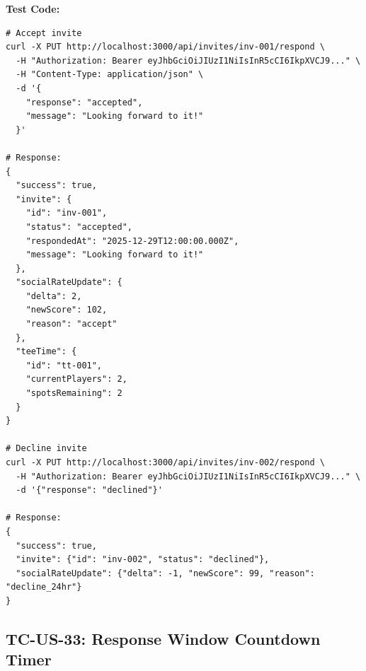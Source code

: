 \documentclass[11pt,a4paper]{article}
\begin{document}
\vspace{0.3cm}
\textbf{Test Code:}
\begin{lstlisting}
# Accept invite
curl -X PUT http://localhost:3000/api/invites/inv-001/respond \
  -H "Authorization: Bearer eyJhbGciOiJIUzI1NiIsInR5cCI6IkpXVCJ9..." \
  -H "Content-Type: application/json" \
  -d '{
    "response": "accepted",
    "message": "Looking forward to it!"
  }'

# Response:
{
  "success": true,
  "invite": {
    "id": "inv-001",
    "status": "accepted",
    "respondedAt": "2025-12-29T12:00:00.000Z",
    "message": "Looking forward to it!"
  },
  "socialRateUpdate": {
    "delta": 2,
    "newScore": 102,
    "reason": "accept"
  },
  "teeTime": {
    "id": "tt-001",
    "currentPlayers": 2,
    "spotsRemaining": 2
  }
}

# Decline invite
curl -X PUT http://localhost:3000/api/invites/inv-002/respond \
  -H "Authorization: Bearer eyJhbGciOiJIUzI1NiIsInR5cCI6IkpXVCJ9..." \
  -d '{"response": "declined"}'

# Response:
{
  "success": true,
  "invite": {"id": "inv-002", "status": "declined"},
  "socialRateUpdate": {"delta": -1, "newScore": 99, "reason": "decline_24hr"}
}
\end{lstlisting}

\vspace{0.5cm}


\subsection{TC-US-33: Response Window Countdown Timer}
\end{document}
